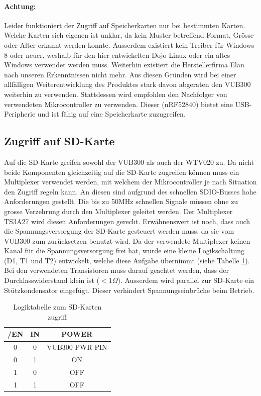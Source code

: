 \paragraph{Achtung:} Leider funktioniert der Zugriff auf Speicherkarten nur bei bestimmten Karten. 
Welche Karten sich eigenen ist unklar, da kein Muster betreffend Format, Grösse oder Alter erkannt werden konnte.
Ausserdem existiert kein Treiber für Windows 8 oder neuer, weshalb für den hier entwickelten Dojo Linux oder ein altes Windows verwendet werden muss.
Weiterhin existiert die Herstellerfirma Elan nach unseren Erkenntnissen nicht mehr. Aus diesen Gründen wird bei einer allfälligen Weiterentwicklung des Produktes stark davon abgeraten den VUB300 weiterhin zu verwenden.
Stattdessen wird empfohlen den Nachfolger von verwendeten Mikrocontroller zu verwenden. Dieser (nRF52840) bietet eine USB-Peripherie und ist fähig auf eine Speicherkarte zuzugreifen. 

\subsection{Zugriff auf SD-Karte}\label{sec:SD_KART}
Auf die SD-Karte greifen sowohl der VUB300 als auch der WTV020 zu. Da nicht beide Komponenten gleichzeitig auf die SD-Karte zugreifen können muss ein Multiplexer verwendet werden, mit welchem der Mikrocontroller je nach Situation den Zugriff regeln kann.
An diesen sind aufgrund des schnellen SDIO-Busses hohe Anforderungen gestellt. Die bis zu 50MHz schnellen Signale müssen ohne zu grosse Verzehrung durch den Multiplexer geleitet werden. Der Multiplexer TS3A27 wird diesen Anforderungen gerecht.
Erwähnenswert ist noch, dass auch die Spannungsversorgung der SD-Karte gesteuert werden muss, da sie vom VUB300 zum zurücksetzen benutzt wird. Da der verwendete Multiplexer keinen Kanal für die Spannungsversorgung frei hat, wurde eine kleine Logikschaltung (D1, T1 und T2) entwickelt, welche diese Aufgabe übernimmt (siehe Tabelle \ref{tab:zugriff}).
Bei den verwendeten Transistoren muss darauf geachtet werden, dass der Durchlasswiderstand klein ist (\(<1\Omega\)). Ausserdem wird parallel zur SD-Karte ein Stützkondensator eingefügt. Dieser verhindert Spannungseinbrüche beim Betrieb.

\vspace{1cm}

\begin{table}[h]
  \centering
  \begin{tabular}{|c|c|c|}
    \hline
    \textbf{/EN} & \textbf{IN} & \textbf{POWER}\\
    \hline
    0 & 0 & VUB300 PWR PIN \\
    \hline
    0 & 1 & ON \\
    \hline
    1 & 0 & OFF \\
    \hline
    1 & 1 & OFF \\
    \hline
  \end{tabular}
  \caption{Logiktabelle zum SD-Karten zugriff}\label{tab:zugriff}
\end{table}
 
